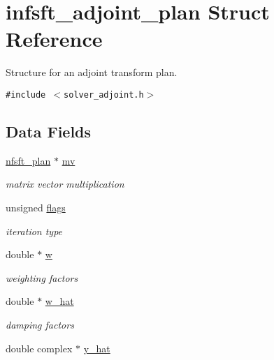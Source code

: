 \hypertarget{structinfsft__adjoint__plan}{
\section{infsft\_\-adjoint\_\-plan Struct Reference}
\label{structinfsft__adjoint__plan}
}
Structure for an adjoint transform plan.  


{\tt \#include $<$solver\_\-adjoint.h$>$}

\subsection*{Data Fields}
\begin{CompactItemize}
\item 
\hypertarget{structinfsft__adjoint__plan_o0}{
\hyperlink{structnfsft__plan}{nfsft\_\-plan} $\ast$ \hyperlink{structinfsft__adjoint__plan_o0}{mv}}
\label{structinfsft__adjoint__plan_o0}

\begin{CompactList}\small\item\em matrix vector multiplication \item\end{CompactList}\item 
\hypertarget{structinfsft__adjoint__plan_o1}{
unsigned \hyperlink{structinfsft__adjoint__plan_o1}{flags}}
\label{structinfsft__adjoint__plan_o1}

\begin{CompactList}\small\item\em iteration type \item\end{CompactList}\item 
\hypertarget{structinfsft__adjoint__plan_o2}{
double $\ast$ \hyperlink{structinfsft__adjoint__plan_o2}{w}}
\label{structinfsft__adjoint__plan_o2}

\begin{CompactList}\small\item\em weighting factors \item\end{CompactList}\item 
\hypertarget{structinfsft__adjoint__plan_o3}{
double $\ast$ \hyperlink{structinfsft__adjoint__plan_o3}{w\_\-hat}}
\label{structinfsft__adjoint__plan_o3}

\begin{CompactList}\small\item\em damping factors \item\end{CompactList}\item 
\hypertarget{structinfsft__adjoint__plan_o4}{
double complex $\ast$ \hyperlink{structinfsft__adjoint__plan_o4}{y\_\-hat}}
\label{structinfsft__adjoint__plan_o4}


\end{CompactItemize}
